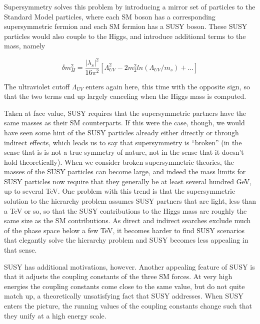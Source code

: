 Supersymmetry solves this problem by introducing a mirror set of particles to the Standard Model particles, where each SM boson has a corresponding supersymmetric fermion and each SM fermion has a SUSY boson.  These SUSY particles would also couple to the Higgs, and introduce additional terms to the mass, namely

\begin{equation}
	\delta m_H^2 = \frac{|\lambda_s |^2}{16\pi^2}[\Lambda_{UV}^2-2m_2^2ln(\Lambda_{UV}/m_s)+\ldots]
\end{equation}

The ultraviolet cutoff $\Lambda_{UV}$ enters again here, this time with the opposite sign, so that the two terms end up largely canceling when the Higgs mass is computed.  

Taken at face value, SUSY requires that the supersymmetric partners have the same masses as their SM counterparts.  If this were the case, though, we would have seen some hint of the SUSY particles already either directly or through indirect effects, which leads us to say that supersymmetry is ``broken'' (in the sense that is is not a true symmetry of nature, not in the sense that it doesn't hold theoretically).  When we consider broken supersymmetric theories, the masses of the SUSY particles can become large, and indeed the mass limits for SUSY particles now require that they generally be at least several hundred GeV, up to several TeV.  One problem with this trend is that the supersymmetric solution to the hierarchy problem assumes SUSY partners that are light, less than a TeV or so, so that the SUSY contributions to the Higgs mass are roughly the same size as the SM contributions.  As direct and indirect searches exclude much of the phase space below a few TeV, it becomes harder to find SUSY scenarios that elegantly solve the hierarchy problem and SUSY becomes less appealing in that sense. 

SUSY has additional motivations, however.  Another appealing feature of SUSY is that it adjusts the coupling constants of the three SM forces.  At very high energies the coupling constants come close to the same value, but do not quite match up, a theoretically unsatisfying fact that SUSY addresses.  When SUSY enters the picture, the running values of the coupling constants change such that they unify at a high energy scale.

